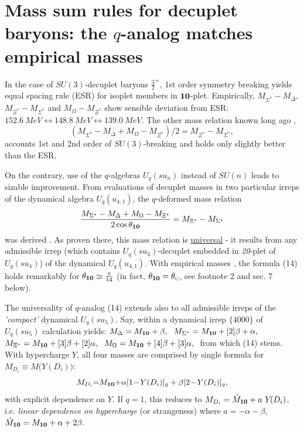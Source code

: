 \documentclass[twoside]{article}
\newcommand{\scr}{\rm\scriptscriptstyle}
\begin{document}
\section{Mass sum rules for decuplet baryons:
         the $q$-analog matches empirical masses}
In the case of $SU(3)$-decuplet baryons ${\frac32}^+$,
1st order symmetry breaking yields         \cite{8-fold}
equal spacing rule (ESR) for isoplet members
in ${\bf 10}$-plet. Empirically,
$M_{\Sigma^*}{-}M_{\Delta},$ $ M_{\Xi^*}{-}M_{\Sigma^*}$ and
$M_{\Omega}{-}M_{\Xi^*}$ show sensible deviation from ESR:
$152.6~MeV\leftrightarrow 148.8~MeV\leftrightarrow 139.0~MeV$.
The other mass relation known long ago     \cite{oku-ko},
\begin{equation}
(M_{\Sigma^{*}}-M_{\Delta}+M_{\Omega}-M_{\Xi^{*}})/2
= M_{\Xi^{*}}-M_{\Sigma^{*}} ,                            \label{(13)}
\end{equation}
accounts 1st and 2nd order of $SU(3)$-breaking and holds
only slightly better than the ESR.

On the contrary, use of the $q$-algebras $U_q(su_n)$ instead of
$SU(n)$ leads to sizable improvement. From evaluations of
decuplet masses in two particular irreps of the dynamical
algebra $U_q(u_{4,1})$, the $q$-deformed mass relation
\begin{equation}
\frac{ M_{\Sigma^*}-M_{\Delta}+M_{\Omega}-M_{\Xi^*} }
     { 2\cos\theta_{\bf 10} }
= M_{\Xi^*}-M_{\Sigma^*}
                                                       \label{(14)}
\end{equation}
was derived   \cite{GKT}. As proven there, this mass relation is
\underline{universal} - it results from any admissible irrep (which
contains $U_q(su_3)$-decuplet embedded in {\em 20}-plet of $U_q(su_4)$)
of the dynamical $U_q(u_{4,1})$.  With empirical masses   \cite{PDG},
the formula (14) holds remarkably for
$\theta_{\bf 10}\simeq\frac{\pi }{14}$
(in fact, $\theta_{\bf 10}=\theta_{\scr{C}}$,
see footnote 2 and sec. 7 below).

The universality of $q$-analog (14) extends also to all
admissible irreps of the {\it 'compact'} dynamical $U_q(su_5)$.
Say, within a dynamical irrep $\{ 4 0 0 0 \}$ of $U_q(su_5)$
calculation yields:
$M_{\Delta}=M_{\bf 10} +  \beta ,\ $
$M_{\Sigma^*}=M_{\bf 10} + [2] \beta +  \alpha ,\ $
$M_{\Xi^*}=M_{\bf 10} + [3] \beta + [2] \alpha ,\ $
$M_{\Omega}=M_{\bf 10} + [4] \beta + [3] \alpha ,\ $
from which (14) stems.  With hypercharge $Y$, all
four masses are comprised by single formula for
$M_{D_i} \equiv M\bigl( Y(D_i) \bigr )$:
\begin{equation}
M_{D_i}{=}M_{\bf 10} {+} {\alpha} [1\!-\!Y(D_i)]_q
             + {\beta} [2\!-\!Y(D_i)]_q ,               \label{(15)}
\end{equation}
with explicit dependence on $Y$.
If $q=1$, this reduces to $M_{D_i} = \tilde{M}_{\bf 10} + a~Y\!(D_i)$,
i.e. {\it linear dependence on hypercharge}
(or strangeness) where $ a = - \alpha - \beta ,\ $
$\tilde{M}_{\bf 10} = M_{\bf 10} + \alpha + 2 \beta.$
\end{document}
